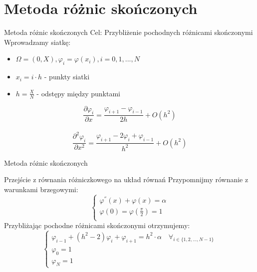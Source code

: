 \section{Metoda różnic skończonych}

	\begin{frame}{Metoda różnic skończonych}
		Cel: Przybliżenie pochodnych różnicami skończonymi
		Wprowadzamy siatkę:
		\begin{itemize}
			\item $\Omega = (0, X), \varphi_i = \varphi(x_i), i = 0,1,...,N$
			\item $x_i = i \cdot h$ - punkty siatki					
			\item $h = \frac{X}{N}$ - odstępy między punktami		
		\end{itemize}

		$$\frac{\partial \varphi_i}{\partial x} = \frac{\varphi_{i+1} - \varphi_{i-1}}{2h} + O(h^2)$$ \\
		$$\frac{\partial^2 \varphi_i}{\partial x^2} = \frac{\varphi_{i+1} - 2 \varphi_i + \varphi_{i-1}}{h^2} + O(h^2)$$
	\end{frame}
\begin{frame}{Metoda różnic skończonych}
		\begin{exampleblock}{Przejście z równania różniczkowego na układ równań}
		Przypomnijmy równanie z warunkami brzegowymi:
		$$
		\begin{cases}
		\varphi^{''}(x) + \varphi(x) = \alpha \\
		\varphi(0) = \varphi(\frac{\pi}{2}) = 1 \\
		\end{cases}
		$$
		Przybliżając pochodne różnicami skończonymi otrzymujemy:
		$$
		\begin{cases}
		\varphi_{i-1} + (h^2 - 2)\varphi_i + \varphi_{i+1} = h^2 \cdot \alpha \quad \forall_{i \in \{1,2, ..., N-1\}} \\
		\varphi_0 = 1 \\
		\varphi_N = 1
		\end{cases}
		$$
	\end{exampleblock}	
\end{frame}


